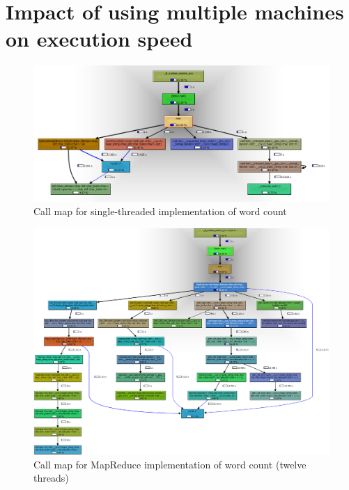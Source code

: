 \documentclass[12pt, letterpaper]{article}
\begin{document}
\section{Impact of using multiple machines on execution speed}
	
\newpage
	\begin{figure}[h]
	\centering
	\includegraphics[width=1.35\textwidth, angle=90]{call-graph-part3-cropped}
	\caption{Call map for single-threaded implementation of word count\label{fig:callMapSingleImpl}}
	\end{figure}
\newpage
	\begin{figure}[h]
	\centering
	\includegraphics[width=1.35\textwidth, angle=90]{call-graph-part4-cropped}
	\caption{Call map for MapReduce implementation of word count (twelve threads)\label{fig:callMapMRImpl}}
	\end{figure}
\end{document}
